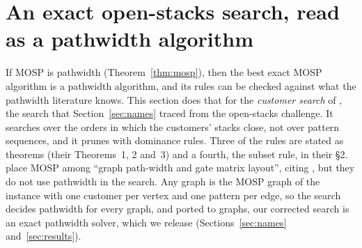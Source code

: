 \section{An exact open-stacks search, read as a pathwidth algorithm}
\label{sec:search}

If MOSP is pathwidth (Theorem~\ref{thm:mosp}), then the best exact MOSP
algorithm is a pathwidth algorithm, and its rules can be checked against what
the pathwidth literature knows. This section does that for the \emph{customer
search} of \citet{ChuStuckey2009}, the search that Section~\ref{sec:names}
traced from the open-stacks challenge. It searches over the orders in which the
customers' stacks close, not over pattern sequences, and it prunes with
dominance rules. Three of the rules are stated as theorems (their Theorems~1,
2 and~3) and a fourth, the subset rule, in their \S2. \citet{ChuStuckey2009}
place MOSP among ``graph path-width and gate matrix layout'', citing
\citet{LY2002}, but they do not use pathwidth in the search. Any graph is the
MOSP graph of the instance with one customer per vertex and one pattern per
edge, so the search decides pathwidth for every graph, and ported to graphs,
our corrected search is an exact pathwidth solver, which we release (Sections~\ref{sec:names} and~\ref{sec:results}).

